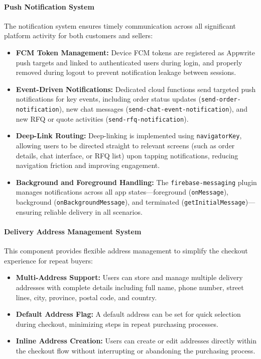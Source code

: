 \paragraph{Push Notification System}
The notification system ensures timely communication across all significant platform activity for both customers and sellers:
\begin{itemize}
    \item \textbf{FCM Token Management:} Device FCM tokens are registered as Appwrite push targets and linked to authenticated users during login, and properly removed during logout to prevent notification leakage between sessions.
    \item \textbf{Event-Driven Notifications:} Dedicated cloud functions send targeted push notifications for key events, including order status updates (\texttt{send-order-notification}), new chat messages (\texttt{send-chat-event-notification}), and new RFQ or quote activities (\texttt{send-rfq-notification}).
    \item \textbf{Deep-Link Routing:} Deep-linking is implemented using \texttt{navigatorKey}, allowing users to be directed straight to relevant screens (such as order details, chat interface, or RFQ list) upon tapping notifications, reducing navigation friction and improving engagement.
    \item \textbf{Background and Foreground Handling:} The \texttt{firebase-messaging} plugin manages notifications across all app states—foreground (\texttt{onMessage}), background (\texttt{onBackgroundMessage}), and terminated (\texttt{getInitialMessage})—ensuring reliable delivery in all scenarios.
\end{itemize}

\paragraph{Delivery Address Management System}
This component provides flexible address management to simplify the checkout experience for repeat buyers:
\begin{itemize}
    \item \textbf{Multi-Address Support:} Users can store and manage multiple delivery addresses with complete details including full name, phone number, street lines, city, province, postal code, and country.
    \item \textbf{Default Address Flag:} A default address can be set for quick selection during checkout, minimizing steps in repeat purchasing processes.
    \item \textbf{Inline Address Creation:} Users can create or edit addresses directly within the checkout flow without interrupting or abandoning the purchasing process.
\end{itemize}

